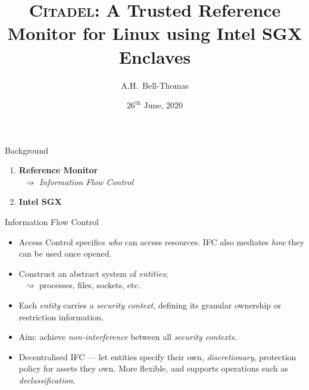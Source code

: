 \documentclass[xcolor=dvipsnames]{beamer}
\title{\textsc{Citadel}: A Trusted Reference Monitor for Linux using Intel SGX Enclaves}
\author{A.H.~Bell-Thomas}
\institute{Computer Laboratory, University of Cambridge}
\date{\scriptsize $26^{\text{th}}$ June, 2020}
\begin{document}
\frame{\titlepage}

\begin{frame}{Background}
\pause
{\large
\begin{enumerate}
    \item \textbf{Reference Monitor} \\
    \pause
    $\;\;\rightsquigarrow$ \textit{Information Flow Control}
    \pause
    \vspace{1cm}
    \item \textbf{Intel SGX}
\end{enumerate}
}
\end{frame}

\begin{frame}{Information Flow Control}
    \begin{itemize}
        \item Access Control specifics \textit{who} can access resources. IFC also mediates \textit{how} they can be used once opened.
        \vspace{5mm}
        \item Construct an abstract system of \textit{entities}; \\
        $\;\;\rightsquigarrow$ processes, files, sockets, etc.
        \vspace{5mm}
        \item Each \textit{entity} carries a \textit{security context}, defining its granular ownership or restriction information.
        \vspace{5mm}
        \item Aim: achieve \textit{non-interference} between all \textit{security contexts}.
        \vspace{5mm}
        \item Decentralised IFC --- let entities specify their own, \textit{discretionary}, protection policy for assets they own. More flexible, and supports operations such as \textit{declassification}.
    \end{itemize}  
\end{frame}
\end{document}
